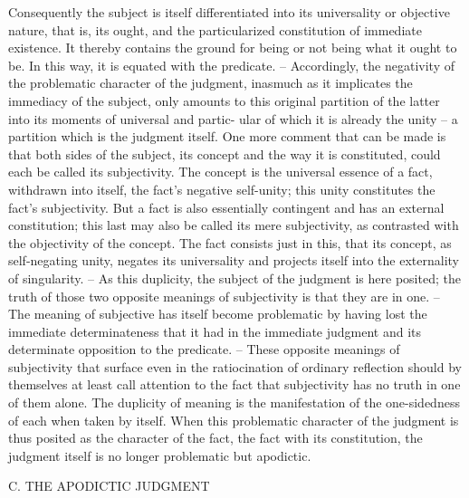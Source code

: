 Consequently the subject is itself differentiated into its universality or
objective nature, that is, its ought, and the particularized constitution
of immediate existence. It thereby contains the ground for being or not
being what it ought to be. In this way, it is equated with the predicate. –
Accordingly, the negativity of the problematic character of the judgment,
inasmuch as it implicates the immediacy of the subject, only amounts to
this original partition of the latter into its moments of universal and partic-
ular of which it is already the unity – a partition which is the judgment
itself.
One more comment that can be made is that both sides of the subject, its
concept and the way it is constituted, could each be called its subjectivity.
The concept is the universal essence of a fact, withdrawn into itself, the
fact's negative self-unity; this unity constitutes the fact's subjectivity. But a
fact is also essentially contingent and has an external constitution; this last
may also be called its mere subjectivity, as contrasted with the objectivity of
the concept. The fact consists just in this, that its concept, as self-negating
unity, negates its universality and projects itself into the externality of
singularity. – As this duplicity, the subject of the judgment is here posited;
the truth of those two opposite meanings of subjectivity is that they are in
one. – The meaning of subjective has itself become problematic by having
lost the immediate determinateness that it had in the immediate judgment
and its determinate opposition to the predicate. – These opposite meanings
of subjectivity that surface even in the ratiocination of ordinary reflection
should by themselves at least call attention to the fact that subjectivity has
no truth in one of them alone. The duplicity of meaning is the manifestation
of the one-sidedness of each when taken by itself.
When this problematic character of the judgment is thus posited as the
character of the fact, the fact with its constitution, the judgment itself is no
longer problematic but apodictic.

C. THE APODICTIC JUDGMENT


